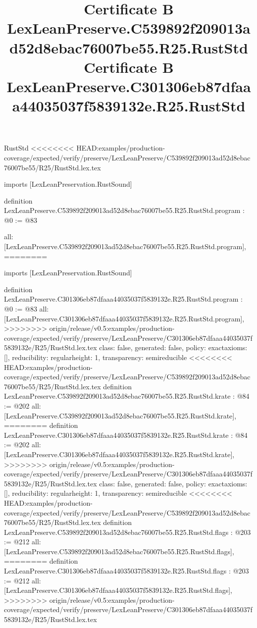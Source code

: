 \begin{lexlean}{RustStd}
<<<<<<<< HEAD:examples/production-coverage/expected/verify/preserve/LexLeanPreserve/C539892f209013ad52d8ebac76007be55/R25/RustStd.lex.tex
\title{Certificate B LexLeanPreserve.C539892f209013ad52d8ebac76007be55.R25.RustStd}
\begin{coremodule}
imports [LexLeanPreservation.RustSound]

definition LexLeanPreserve.C539892f209013ad52d8ebac76007be55.R25.RustStd.program : @0 := @83 {
  all: [LexLeanPreserve.C539892f209013ad52d8ebac76007be55.R25.RustStd.program],
========
\title{Certificate B LexLeanPreserve.C301306eb87dfaaa44035037f5839132e.R25.RustStd}
\begin{coremodule}
imports [LexLeanPreservation.RustSound]

definition LexLeanPreserve.C301306eb87dfaaa44035037f5839132e.R25.RustStd.program : @0 := @83 {
  all: [LexLeanPreserve.C301306eb87dfaaa44035037f5839132e.R25.RustStd.program],
>>>>>>>> origin/release/v0.5:examples/production-coverage/expected/verify/preserve/LexLeanPreserve/C301306eb87dfaaa44035037f5839132e/R25/RustStd.lex.tex
  class: false,
  generated: false,
  policy: exact{axioms: []},
  reducibility: regular{height: 1},
  transparency: semireducible
}
<<<<<<<< HEAD:examples/production-coverage/expected/verify/preserve/LexLeanPreserve/C539892f209013ad52d8ebac76007be55/R25/RustStd.lex.tex
definition LexLeanPreserve.C539892f209013ad52d8ebac76007be55.R25.RustStd.krate : @84 := @202 {
  all: [LexLeanPreserve.C539892f209013ad52d8ebac76007be55.R25.RustStd.krate],
========
definition LexLeanPreserve.C301306eb87dfaaa44035037f5839132e.R25.RustStd.krate : @84 := @202 {
  all: [LexLeanPreserve.C301306eb87dfaaa44035037f5839132e.R25.RustStd.krate],
>>>>>>>> origin/release/v0.5:examples/production-coverage/expected/verify/preserve/LexLeanPreserve/C301306eb87dfaaa44035037f5839132e/R25/RustStd.lex.tex
  class: false,
  generated: false,
  policy: exact{axioms: []},
  reducibility: regular{height: 1},
  transparency: semireducible
}
<<<<<<<< HEAD:examples/production-coverage/expected/verify/preserve/LexLeanPreserve/C539892f209013ad52d8ebac76007be55/R25/RustStd.lex.tex
definition LexLeanPreserve.C539892f209013ad52d8ebac76007be55.R25.RustStd.flags : @203 := @212 {
  all: [LexLeanPreserve.C539892f209013ad52d8ebac76007be55.R25.RustStd.flags],
========
definition LexLeanPreserve.C301306eb87dfaaa44035037f5839132e.R25.RustStd.flags : @203 := @212 {
  all: [LexLeanPreserve.C301306eb87dfaaa44035037f5839132e.R25.RustStd.flags],
>>>>>>>> origin/release/v0.5:examples/production-coverage/expected/verify/preserve/LexLeanPreserve/C301306eb87dfaaa44035037f5839132e/R25/RustStd.lex.tex
}}}
\end{coremodule}}
\end{coremodule}
\end{lexlean}
